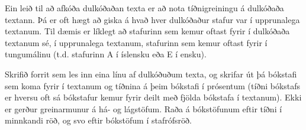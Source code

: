 \begin{problem}
	Ein leið til að afkóða dulkóðaðan texta er að nota tíðnigreiningu á dulkóðaða textann. Þá er oft hægt að giska á hvað hver dulkóðaður stafur var í upprunalega textanum. Til dæmis er líklegt að stafurinn sem kemur oftast fyrir í dulkóðaða textanum sé, í upprunalega textanum, stafurinn sem kemur oftast fyrir í tungumálinu (t.d. stafurinn A í íslensku eða E í ensku).

	Skrifið forrit sem les inn eina línu af dulkóðuðum texta, og skrifar út þá bókstafi sem koma fyrir í textanum og tíðnina á þeim bókstafi í prósentum (tíðni bókstafs er hversu oft sá bókstafur kemur fyrir deilt með fjölda bókstafa í textanum). Ekki er gerður greinarmunur á há- og lágstöfum. Raða á bókstöfunum eftir tíðni í minnkandi röð, og svo eftir bókstöfum í stafrófsröð.

\begin{example}
%
\end{example}
\begin{example}
%
\end{example}
\end{problem}